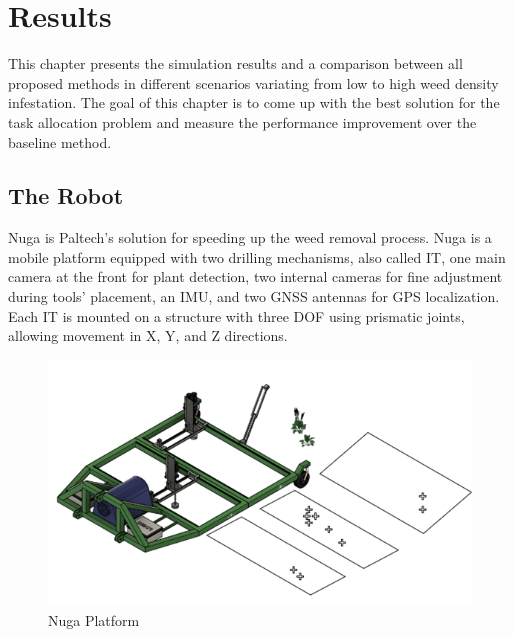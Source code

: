 \chapter{Results}\label{ch:Results}
This chapter presents the simulation results and a comparison between all proposed methods in different scenarios variating from low to high weed density infestation. The goal of this chapter is to come up with the best solution for the task allocation problem and measure the performance improvement over the baseline method.

\section{The Robot}\label{sec:nuga}
Nuga is Paltech's solution for speeding up the weed removal process. Nuga is a mobile platform equipped with two drilling mechanisms, also called \ac{IT}, one main camera at the front for plant detection, two internal cameras for fine adjustment during tools' placement, an IMU, and two GNSS antennas for GPS localization. Each \ac{IT} is mounted on a structure with three \ac{DOF} using prismatic joints, allowing movement in X, Y, and Z directions.

\begin{figure}[bth]
    \centering
    \includegraphics[width=0.7\linewidth]{gfx/ch03/nuga_cad.png}
    \caption{Nuga Platform}
    \label{fig:nuga-cad}
\end{figure}





